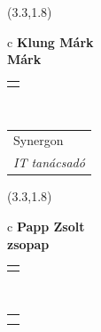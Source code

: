 \documentclass[11pt]{article}
\begin{document}
\makebox(3.3,1.8){
  \renewcommand\arraystretch{1.3}
  \begin{tabular}[c]{c}
    \hspace{8.5mm}
    \LARGE\bf{ Klung Márk }\\
    \hspace{8.5mm}
    \Large{ Márk }\\
    \renewcommand\arraystretch{3}
    \begin{tabular}[c]{c}
      \centering
      \fontfamily{phv}\selectfont{
        \textbf{
          \textsc{
            \scriptsize{
            \color{Dark}{ Ismerkedő }\color{Dark}{ Webmester }\color{Bright}{ Sminkmester }\color{Bright}{ Programozó }
            }
          }
        }
      }
    \end{tabular}
    \\
    \renewcommand\arraystretch{1}
    \begin{tabular}{p{3.3in}}
      \hspace{.7cm}Synergon\\
      \hspace{.7cm}\emph{ IT tanácsadó }\\
    \end{tabular}
  \end{tabular}
}

\makebox(3.3,1.8){
  \renewcommand\arraystretch{1.3}
  \begin{tabular}[c]{c}
    \hspace{8.5mm}
    \LARGE\bf{ Papp Zsolt }\\
    \hspace{8.5mm}
    \Large{ zsopap }\\
    \renewcommand\arraystretch{3}
    \begin{tabular}[c]{c}
      \centering
      \fontfamily{phv}\selectfont{
        \textbf{
          \textsc{
            \scriptsize{
            \color{Bright}{ Ismerkedő }\color{Dark}{ Webmester }\color{Dark}{ Sminkmester }\color{Bright}{ Programozó }
            }
          }
        }
      }
    \end{tabular}
    \\
    \renewcommand\arraystretch{1}
    \begin{tabular}{p{3.3in}}
      \hspace{.7cm}\\
      \hspace{.7cm}\emph{  }\\
    \end{tabular}
  \end{tabular}
}
\end{document}
